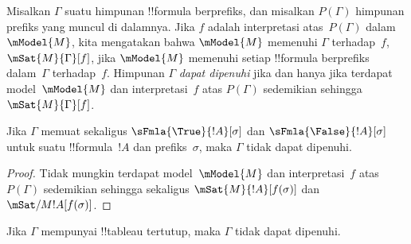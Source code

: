 \documentclass[../../../include/open-logic-section]{subfiles}
\begin{document}
\begin{defn}
  Misalkan $\Gamma$ suatu himpunan !!{formula} berprefiks, dan misalkan
  $P(\Gamma)$ himpunan prefiks yang muncul di dalamnya. Jika $f$ adalah
  interpretasi atas~$P(\Gamma)$ dalam $\mModel{M}$, kita mengatakan bahwa
  $\mModel{M}$ memenuhi $\Gamma$ terhadap~$f$,
  $\mSat{M}{\Gamma}[f]$, jika $\mModel{M}$ memenuhi setiap !!{formula}
  berprefiks dalam~$\Gamma$ terhadap~$f$. Himpunan $\Gamma$ \emph{dapat
  dipenuhi} jika dan hanya jika terdapat model~$\mModel{M}$ dan
  interpretasi~$f$ atas $P(\Gamma)$ sedemikian sehingga
  $\mSat{M}{\Gamma}[f]$.
\end{defn}

\begin{prop}
  Jika $\Gamma$ memuat sekaligus $\sFmla{\True}{!A}[\sigma]$ dan
  $\sFmla{\False}{!A}[\sigma]$ untuk suatu !!{formula}~$!A$ dan
  prefiks~$\sigma$, maka $\Gamma$ tidak dapat dipenuhi.
\end{prop}

\begin{proof}
  Tidak mungkin terdapat model~$\mModel{M}$ dan interpretasi~$f$ atas
  $P(\Gamma)$ sedemikian sehingga sekaligus
  $\mSat{M}{!A}[f(\sigma)]$ dan $\mSat/{M}{!A}[f(\sigma)]$.
\end{proof}

\begin{thm}[Kesahihan]
  Jika $\Gamma$ mempunyai !!{tableau} tertutup, maka $\Gamma$ tidak dapat
  dipenuhi.
\end{thm}
\end{document}
